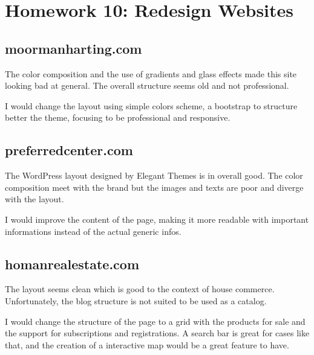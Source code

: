 \chapter{Homework 10: Redesign Websites}
	\section{moormanharting.com}
		The color composition and the use of gradients and glass effects made this site looking bad at general. The overall structure seems old and not professional.

		I would change the layout using simple colors scheme, a bootstrap to structure better the theme, focusing to be professional and responsive.

	\section{preferredcenter.com}
		The WordPress layout designed by Elegant Themes is in overall good. The color composition meet with the brand but the images and texts are poor and diverge with the layout.

		I would improve the content of the page, making it more readable with important informations instead of the actual generic infos.

	\section{homanrealestate.com}
		The layout seems clean which is good to the context of house commerce. Unfortunately, the blog structure is not suited to be used as a catalog.

		I would change the structure of the page to a grid with the products for sale and the support for subscriptions and registrations. A search bar is great for cases like that, and the creation of a interactive map would be a great feature to have.
